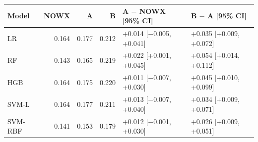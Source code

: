 \begin{tabular}{lrrrll}
\toprule
Model & NOWX & A & B & A $-$ NOWX [95\% CI] & B $-$ A [95\% CI] \\
\midrule
LR & 0.164 & 0.177 & 0.212 & +0.014 [$-$0.005, +0.041] & +0.035 [+0.009, +0.072] \\
RF & 0.143 & 0.165 & 0.219 & +0.022 [+0.001, +0.045] & +0.054 [+0.014, +0.112] \\
HGB & 0.164 & 0.175 & 0.220 & +0.011 [$-$0.007, +0.030] & +0.045 [+0.010, +0.099] \\
SVM-L & 0.164 & 0.177 & 0.211 & +0.013 [$-$0.007, +0.040] & +0.034 [+0.009, +0.071] \\
SVM-RBF & 0.141 & 0.153 & 0.179 & +0.012 [$-$0.001, +0.030] & +0.026 [+0.009, +0.051] \\
\bottomrule
\end{tabular}
